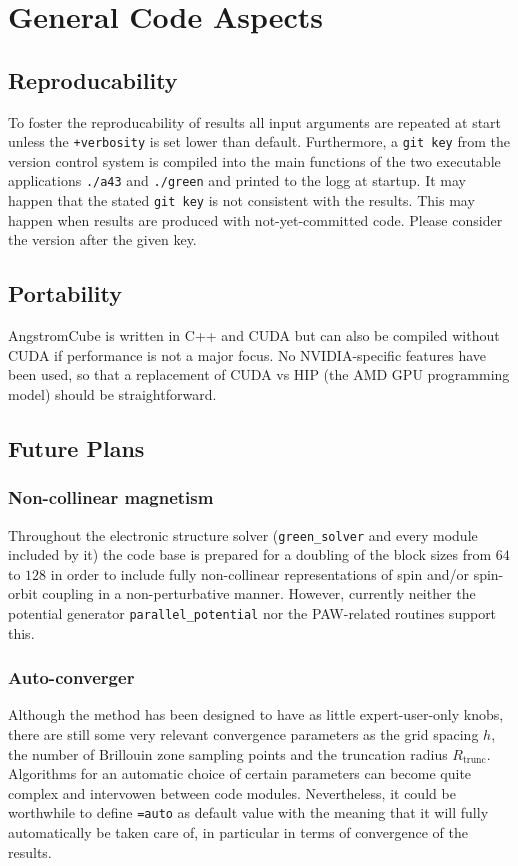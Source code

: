 \documentclass[oribibl]{llncs}
\newcommand{\um}[1]{_{\mathrm{#1}}}
\newcommand{\ttt}[1]{\texttt{#1}}
\newcommand{\fullcodename}{AngstromCube}
\begin{document}
\newpage

\section{General Code Aspects}

\subsection{Reproducability}
%
To foster the reproducability of results all input arguments are repeated at start 
unless the \ttt{+verbosity} is set lower than default.
Furthermore, a \ttt{git key} from the version control system is compiled into the main functions
of the two executable applications \ttt{./a43} and \ttt{./green}
and printed to the logg at startup.
It may happen that the stated \ttt{git key} is not consistent with the results.
This may happen when results are produced with not-yet-committed code.
Please consider the version after the given key.

\subsection{Portability}
%
\fullcodename{} is written in C++ and CUDA but can also be compiled without CUDA 
if performance is not a major focus. No NVIDIA-specific features have been used,
so that a replacement of CUDA vs HIP (the AMD GPU programming model) should be straightforward. 

\subsection{Future Plans}
%
\subsubsection*{Non-collinear magnetism}
%
Throughout the electronic structure solver (\ttt{green\_solver} and every module included by it)
the code base is prepared for a doubling of the block sizes from $64$ to $128$ in order to
include fully non-collinear representations of spin and/or spin-orbit coupling in a non-perturbative manner.
However, currently neither the potential generator \ttt{parallel\_potential} nor the \ac{PAW}-related routines support this.

\subsubsection*{Auto-converger}
%
Although the method has been designed to have as little expert-user-only knobs,
there are still some very relevant convergence parameters as the grid spacing $h$, 
the number of Brillouin zone sampling points and the truncation radius $R\um{trunc}$.
Algorithms for an automatic choice of certain parameters can become quite complex and intervowen between code modules.
Nevertheless, it could be worthwhile to define \ttt{=auto} as default value with the meaning that it will fully automatically
be taken care of, in particular in terms of convergence of the results.
\end{document}
